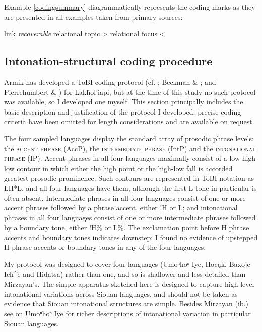 \documentclass[output=paper]{LSP/langsci}
\begin{document}
Example \ref{codingsummary} diagrammatically represents the coding marks as they are presented in all examples taken from primary sources:

\ea\label{codingsummary}{\underline{link} \textit{recoverable} relational topic > relational focus <}\z

\subsection{Intonation-structural coding procedure}\label{intonationcoding}

Armik \citet{Mirzayan2011} has developed a ToBI coding protocol (cf. \citealt{Pierrehumbert1980}; Beckman \& \citealt{Pierrehumbert1986}; and Pierrehumbert \& \citealt{Hirschberg1990}) for Lakȟol’iapi, but at the time of this study no such protocol was available, so I developed one myself. This section principally includes the basic description and justification of the protocol I developed; precise coding criteria have been omitted for length considerations and are available on request. 

The four sampled languages display the standard array of prosodic phrase levels: the \textsc{accent phrase} (AccP), the \textsc{intermediate phrase} (IntP) and the \textsc{intonational phrase} (IP). Accent phrases in all four languages maximally consist of a low-high-low contour in which either the high point or the high-low fall is accorded greatest prosodic prominence. Such contours are represented in ToBI notation as LH*L, and all four languages have them, although the first L tone in particular is often absent. Intermediate phrases in all four languages consist of one or more accent phrases followed by a phrase accent, either !H or L; and intonational phrases in all four languages consist of one or more intermediate phrases followed by a boundary tone, either !H\% or L\%. The exclamation point before H phrase accents and boundary tones indicates downstep: I found no evidence of upstepped H phrase accents or boundary tones in any of the four languages. 

My protocol was designed to cover four languages (Umoⁿhoⁿ Iye, Hocąk, Baxoje Ich\^{}e and Hidatsa) rather than one, and so is shallower and less detailed than Mirzayan’s. The simple apparatus sketched here is designed to capture high-level intonational variations across Siouan languages, and should not be taken as evidence that Siouan intonational structures are simple. Besides Mirzayan (ib.) see \citet{Larson2009} on Umoⁿhoⁿ Iye for richer descriptions of intonational variation in particular Siouan languages. 
\end{document}
